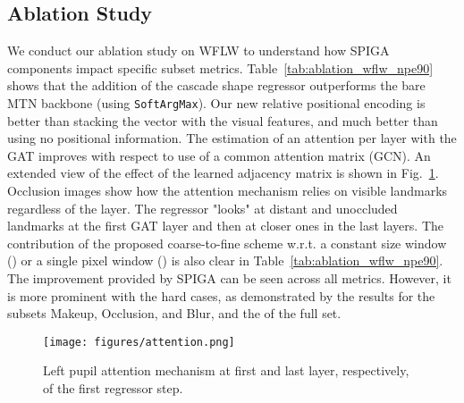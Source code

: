 \documentclass{bmvc2k}
\begin{document}
\subsection{Ablation Study}
\label{sec:ablation}

We conduct our ablation study on WFLW to understand how SPIGA components impact specific subset metrics. 
Table~\ref{tab:ablation_wflw_npe90} shows that the addition of the cascade shape regressor outperforms the bare MTN backbone (using \texttt{SoftArgMax}). 
Our new relative positional encoding is better than stacking the vector  with the visual features,
and much better than using no positional information. The estimation of an attention per layer with the GAT improves with respect to use of a common attention matrix (GCN). An extended view of the effect of the learned adjacency matrix is shown in Fig.~\ref{fig:attention}. Occlusion images show how the attention mechanism relies on visible landmarks regardless of the layer. The regressor "looks" at distant and unoccluded landmarks at the first GAT layer and then at closer ones in the last layers. The contribution of the proposed coarse-to-fine scheme w.r.t. a constant size window () or a single pixel window () is also clear in Table~\ref{tab:ablation_wflw_npe90}. The improvement provided by SPIGA can be seen across all metrics. However, it is more prominent with the hard cases, as demonstrated by the results for the subsets  Makeup, Occlusion, and Blur, and the  of the full set.

\begin{figure}
    \centering
    \texttt{[image: figures/attention.png]}
    \caption{Left pupil attention mechanism at first and last layer, respectively, of the first regressor step.}
    \label{fig:attention}
\end{figure}
\end{document}
